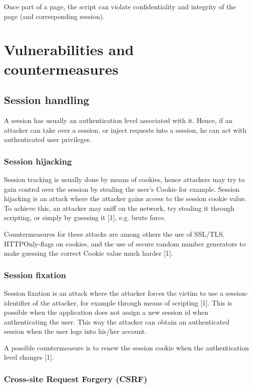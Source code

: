 Once part of a page, the script can violate confidentiality and integrity of the page (and corresponding session).



\section{Vulnerabilities and countermeasures}

\subsection{Session handling}

A session has usually an authentication level associated with it. Hence, if an attacker can take over a session, or inject requests into a session, he can act with authenticated user privileges.


\subsubsection{Session hijacking}

Session tracking is usually done by means of cookies, hence attackers may try to gain control over the session by stealing the user's Cookie for example. Session hijacking is an attack where the attacker gains access to the session cookie value. To achieve this, an attacker may sniff on the network, try stealing it through scripting, or simply by guessing it [1], e.g. brute force.

Countermeasures for these attacks are among others the use of SSL/TLS, HTTPOnly-flags on cookies, and the use of secure random number generators to make guessing the correct Cookie value much harder [1].


\subsubsection{Session fixation}

Session fixation is an attack where the attacker forces the victim to use a session-identifier of the attacker, for example through means of scripting [1]. This is possible when the application does not assign a new session id when authenticating the user. This way the attacker can obtain an authenticated session when the user logs into his/her account.

A possible countermeasure is to renew the session cookie when the authentication level changes [1].


\subsubsection{Cross-site Request Forgery (CSRF)}

